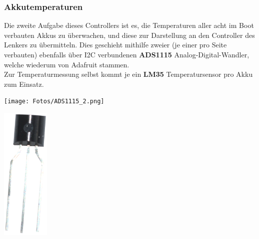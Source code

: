 \subsubsection{Akkutemperaturen}
Die zweite Aufgabe dieses Controllers ist es, die Temperaturen aller acht im Boot verbauten Akkus zu überwachen, und diese zur Darstellung an den Controller des Lenkers zu übermitteln.
Dies geschieht mithilfe zweier (je einer pro Seite verbauten) ebenfalls über I2C verbundenen \textbf{ADS1115} Analog-Digital-Wandler, welche wiederum von Adafruit stammen.\\
Zur Temperaturmessung selbst kommt je ein \textbf{LM35} Temperatursensor pro Akku zum Einsatz.\\

\begin{minipage}{8cm}
    \centering
    \texttt{[image: Fotos/ADS1115\_2.png]}
\end{minipage}
\begin{minipage}{8cm}
    \centering
    \includegraphics[width=0.17\textwidth]{Fotos/LM35.png}
\end{minipage}\\
\vspace{0.5cm}

